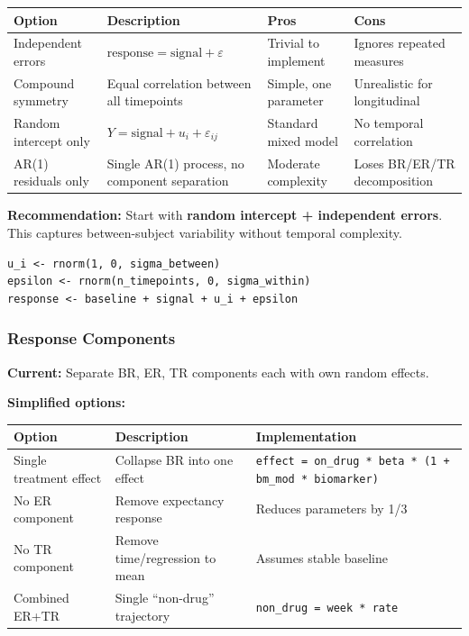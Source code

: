 \documentclass[11pt]{article}
\begin{document}
\begin{table}[h]
\centering\small
\begin{tabular}{@{}L{3cm}L{4cm}L{3cm}L{3.5cm}@{}}
\toprule
Option & Description & Pros & Cons \\
\midrule
Independent errors & $\text{response} = \text{signal} + \varepsilon$ & Trivial to implement & Ignores repeated measures \\
Compound symmetry & Equal correlation between all timepoints & Simple, one parameter & Unrealistic for longitudinal \\
Random intercept only & $Y = \text{signal} + u_i + \varepsilon_{ij}$ & Standard mixed model & No temporal correlation \\
AR(1) residuals only & Single AR(1) process, no component separation & Moderate complexity & Loses BR/ER/TR decomposition \\
\bottomrule
\end{tabular}
\end{table}

\textbf{Recommendation:} Start with \textbf{random intercept +
independent errors}. This captures between-subject variability without
temporal complexity.

\begin{Verbatim}[fontsize=\small]
u_i <- rnorm(1, 0, sigma_between)
epsilon <- rnorm(n_timepoints, 0, sigma_within)
response <- baseline + signal + u_i + epsilon
\end{Verbatim}

\subsubsection{Response Components}

\textbf{Current:} Separate BR, ER, TR components each with own random
effects.

\textbf{Simplified options:}

\begin{table}[h]
\centering\small
\begin{tabular}{@{}L{3.5cm}L{4.5cm}L{5.5cm}@{}}
\toprule
Option & Description & Implementation \\
\midrule
Single treatment effect & Collapse BR into one effect & \texttt{effect = on\_drug * beta * (1 + bm\_mod * biomarker)} \\
No ER component & Remove expectancy response & Reduces parameters by 1/3 \\
No TR component & Remove time/regression to mean & Assumes stable baseline \\
Combined ER+TR & Single ``non-drug'' trajectory & \texttt{non\_drug = week * rate} \\
\bottomrule
\end{tabular}
\end{table}
\end{document}
